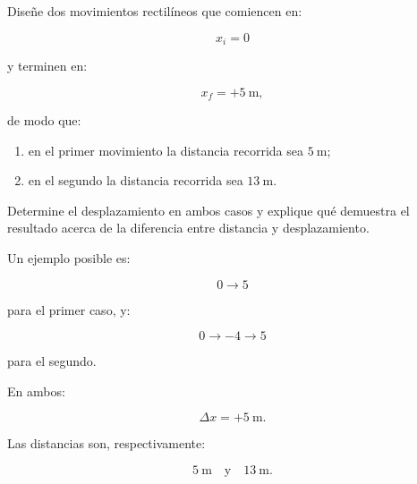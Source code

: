 \nivelavanzado


\begin{ejercicio}
Diseñe dos movimientos rectilíneos que comiencen en:

\[ x_i=0 \]

y terminen en:

\[ x_f=+\SI{5}{\meter}, \]

de modo que:

\begin{enumerate}[label=\alph*)]
    \item en el primer movimiento la distancia recorrida sea \(\SI{5}{\meter}\);
    \item en el segundo la distancia recorrida sea \(\SI{13}{\meter}\).
\end{enumerate}

Determine el desplazamiento en ambos casos y explique qué demuestra el resultado acerca de la diferencia entre distancia y desplazamiento.
\end{ejercicio}

\begin{respuesta}
Un ejemplo posible es:

\[
0\longrightarrow5
\]

para el primer caso, y:

\[
0\longrightarrow-4\longrightarrow5
\]

para el segundo.

En ambos:

\[ \Delta x=+\SI{5}{\meter}. \]

Las distancias son, respectivamente:

\[ \SI{5}{\meter}\quad\text{y}\quad\SI{13}{\meter}. \]
\end{respuesta}

